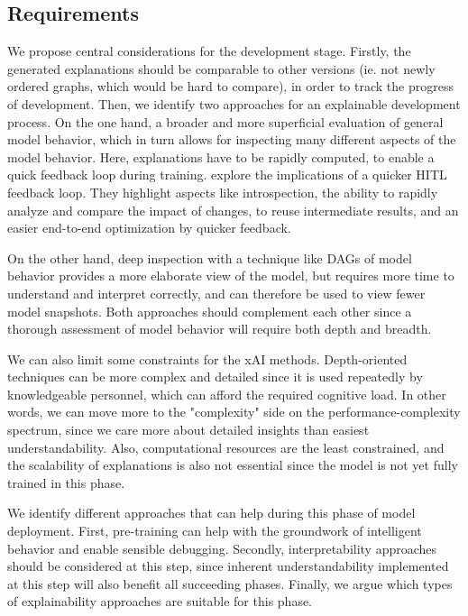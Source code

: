 \documentclass[twoside,11pt]{article}
\begin{document}
\subsection{Requirements}
We propose central considerations for the development stage. Firstly, the generated explanations should be comparable to other versions (ie. not newly ordered graphs, which would be hard to compare), in order to track the progress of development. 
Then, we identify two approaches for an explainable development process. On the one hand, a broader and more superficial evaluation of general model behavior, which in turn allows for inspecting many different aspects of the model behavior. Here, explanations have to be rapidly computed, to enable a quick feedback loop during training. 
\citet{XinEtAl:2018:HITLMLFeedbackLoop} explore the implications of a quicker HITL feedback loop. They highlight aspects like introspection, the ability to rapidly analyze and compare the impact of changes, to reuse intermediate results, and an easier end-to-end optimization by quicker feedback.

On the other hand, deep inspection with a technique like DAGs of model behavior provides a more elaborate view of the model, but requires more time to understand and interpret correctly, and can therefore be used to view fewer model snapshots. Both approaches should complement each other since a thorough assessment of model behavior will require both depth and breadth.

We can also limit some constraints for the xAI methods. Depth-oriented techniques can be more complex and detailed since it is used repeatedly by knowledgeable personnel, which can afford the required cognitive load. In other words, we can move more to the "complexity" side on the performance-complexity spectrum, since we care more about detailed insights than easiest understandability. Also, computational resources are the least constrained, and the scalability of explanations is also not essential since the model is not yet fully trained in this phase.

We identify different approaches that can help during this phase of model deployment. First, pre-training can help with the groundwork of intelligent behavior and enable sensible debugging. Secondly, interpretability approaches should be considered at this step, since inherent understandability implemented at this step will also benefit all succeeding phases. Finally, we argue which types of explainability approaches are suitable for this phase.
\end{document}
